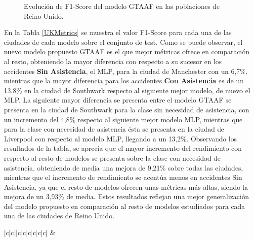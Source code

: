 \documentclass{uathesis-es}
\begin{document}
{\begin{figure}[H]
     \caption{Evolución de F1-Score del modelo GTAAF en las poblaciones de Reino Unido.}
  \label{UKLossFunction}
  \end{figure}


En la Tabla \ref{UKMetrics} se muestra el valor F1-Score para cada una de las ciudades de cada modelo sobre el conjunto de test. Como se puede observar, el nuevo modelo propuesto GTAAF es el que mejor métricas ofrece en comparación al resto, obteniendo la mayor diferencia con respecto a su sucesor en los accidentes \textbf{Sin Asistencia}, el MLP, para la ciudad de Manchester con un 6,7\%, mientras que la mayor diferencia para los accidentes \textbf{Con Asistencia} es de un 13.8\% en la ciudad de Southwark respecto al siguiente mejor modelo, de nuevo el MLP. La siguiente mayor diferencia se presenta entre el modelo GTAAF se presenta en la ciudad de Southwark para la clase sin necesidad de asistencia, con un incremento del 4,8\% respecto al siguiente mejor modelo MLP, mientras que para la clase con necesidad de asistencia ésta se presenta en la ciudad de Liverpool con respecto al modelo MLP, llegando a un 13,2\%. Observando los resultados de la tabla, se aprecia que el mayor incremento del rendimiento con respecto al resto de modelos se presenta sobre la clase con necesidad de asistencia, obteniendo de media una mejora de 9,21\% sobre todas las ciudades, mientras que el incremento de rendimiento se acentúa menos en accidentes Sin Asistencia, ya que el resto de modelos ofrecen unas métricas más altas, siendo la mejora de un 3,93\% de media. Estos resultados reflejan una mejor generalización del modelo propuesto en comparación al resto de modelos estudiados para cada una de las ciudades de Reino Unido.

\begin{table}[H]
    \begin{center}
        \begin{tabular}{|c|c||c|c|c|c|c|c|}
        \hline
         &
         \\ \hline


\end{tabular}
\end{center}
\end{table}}
\end{document}
